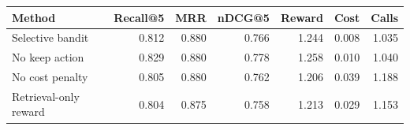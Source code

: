 \begin{tabular}{lrrrrrr}
\toprule
Method & Recall@5 & MRR & nDCG@5 & Reward & Cost & Calls \\
\midrule
Selective bandit & 0.812 & 0.880 & 0.766 & 1.244 & 0.008 & 1.035 \\
No keep action & 0.829 & 0.880 & 0.778 & 1.258 & 0.010 & 1.040 \\
No cost penalty & 0.805 & 0.880 & 0.762 & 1.206 & 0.039 & 1.188 \\
Retrieval-only reward & 0.804 & 0.875 & 0.758 & 1.213 & 0.029 & 1.153 \\
\bottomrule
\end{tabular}
